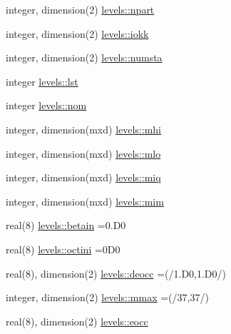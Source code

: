 \begin{DoxyCompactItemize}
\item 
integer, dimension(2) \hyperlink{namespacelevels_ac7fcd5c6719ad0864f89f22dcb0e60f0}{levels\+::npart}
\item 
integer, dimension(2) \hyperlink{namespacelevels_a1d09edb9536af05aff0efae9b7871ee1}{levels\+::iokk}
\item 
integer, dimension(2) \hyperlink{namespacelevels_a6eac8703a80522d7c3404d75a7e07e31}{levels\+::numsta}
\item 
integer \hyperlink{namespacelevels_a79dde0705e3ca458744bc90ffe752e66}{levels\+::lst}
\item 
integer \hyperlink{namespacelevels_af99762eb2e2686cee88093daddf503c0}{levels\+::nom}
\item 
integer, dimension(mxd) \hyperlink{namespacelevels_af4cae1dd585ebc4fefc67e9b52583d4c}{levels\+::mhi}
\item 
integer, dimension(mxd) \hyperlink{namespacelevels_ad9e8443a0bdfbd278d0bf92ddc6b450a}{levels\+::mlo}
\item 
integer, dimension(mxd) \hyperlink{namespacelevels_a6b4800eb9c482f58ae07e726f5ffa192}{levels\+::miq}
\item 
integer, dimension(mxd) \hyperlink{namespacelevels_a810b7d5167ba33e2d1126f6e037aa4de}{levels\+::mim}
\item 
real(8) \hyperlink{namespacelevels_a90ac397f7481d5557bfe538aceb88baf}{levels\+::betain} =0.\+D0
\item 
real(8) \hyperlink{namespacelevels_a81fc7d136ad35187b994a2fd527c40ac}{levels\+::octini} =0\+D0
\item 
real(8), dimension(2) \hyperlink{namespacelevels_a58c7797165cbe249571a4ada2e6d5a55}{levels\+::deocc} =(/1.\+D0,1.\+D0/)
\item 
integer, dimension(2) \hyperlink{namespacelevels_a243a270ec88ba667b841f634868f6399}{levels\+::mmax} =(/37,37/)
\item 
real(8), dimension(2) \hyperlink{namespacelevels_a17e702afe8dd8f9a0bad49c50ffcc744}{levels\+::eocc}
\end{DoxyCompactItemize}
